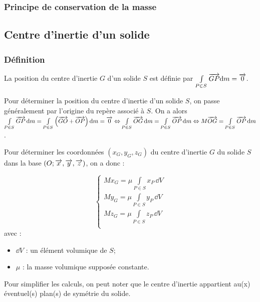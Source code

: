 \documentclass[10pt,fleqn]{article} %
\begin{document}
\subsubsection{Principe de conservation de la masse}

\subsection{Centre d'inertie d'un solide}
\subsubsection{Définition}

\begin{defi}
La position du centre d'inertie $G$ d'un solide $S$ est définie par $\int\limits_{P\in S} \overrightarrow{GP} \text{d} m = \overrightarrow{0}$.
\end{defi}

Pour déterminer la position du centre d'inertie d'un solide $S$, on passe généralement par l'origine du repère associé à $S$. On a alors 
$\int\limits_{P\in S} \overrightarrow{GP} \, \text{d} m=\int\limits_{P\in S} \left(\overrightarrow{GO}+\overrightarrow{OP}\right) \text{d} m = \overrightarrow{0} 
\Leftrightarrow \int\limits_{P\in S} \overrightarrow{OG} \,\text{d} m =\int\limits_{P\in S} \overrightarrow{OP} \,\text{d} m
\Leftrightarrow  M\overrightarrow{OG} =\int\limits_{P\in S} \overrightarrow{OP} \,\text{d} m$.

\begin{methode}
Pour déterminer les coordonnées $\left(x_G,y_G,z_G\right)$ du centre d'inertie $G$ du solide $S$ dans la base $\left(O;\overrightarrow{x},\overrightarrow{y},\overrightarrow{z} \right)$, on a donc :
\begin{multicols}{2}
$$
\left\{
\begin{array}{l}
M x_G =\mu \int\limits_{P\in S} x_P \,\dd V \\
M y_G =\mu \int\limits_{P\in S} y_P \,\dd V \\
M z_G =\mu \int\limits_{P\in S} z_P \,\dd V \\
\end{array}
\right. 
$$
avec : 
\begin{itemize}
  \item $\dd V$ : un élément volumique de $S$;
  \item $\mu$ : la masse volumique supposée constante.
\end{itemize}
Pour simplifier les calculs, on peut noter que le centre d'inertie appartient au(x) éventuel(s) plan(s) de symétrie du solide.

\end{multicols}



\end{methode}
\end{document}
